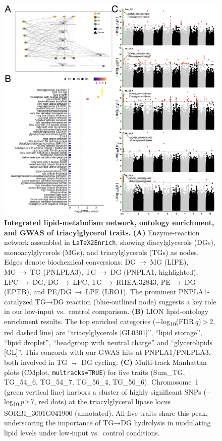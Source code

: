 \documentclass[10pt,letterpaper]{article}
\begin{document}
\begin{figure}[ht]
  \centering
  \includegraphics[width=\textwidth]{fig/main/Fig6.png}
  \caption{\textbf{Integrated lipid‐metabolism network, ontology enrichment, and GWAS of triacylglycerol traits.}
    \textbf{(A)} Enzyme‐reaction network assembled in \texttt{LaTeX2Enrich}, showing diacylglycerols (DGs), monoacylglycerols (MGs), and triacylglycerols (TGs) as nodes.  Edges denote biochemical conversions: DG → MG (LIPE), MG → TG (PNLPLA3), TG → DG (PNPLA1, highlighted), LPC → DG, DG → LPC, TG → RHEA:32843, PE → DG (EPTB), and PE/DG → LPE (LRO1).  The prominent PNPLA1‐catalyzed TG→DG reaction (blue‐outlined node) suggests a key role in our low‑input vs.\ control comparison.
    \textbf{(B)} LION lipid‐ontology enrichment results.  The top enriched categories (−log\textsubscript{10}(FDR $q$) > 2, red dashed line) are “triacylglycerols [GL0301]”, “lipid storage”, “lipid droplet”, “headgroup with neutral charge” and “glycerolipids [GL]”.  This concords with our GWAS hits at PNPLA1/PNLPLA3, both involved in TG ↔ DG cycling.
    \textbf{(C)} Multi‑track Manhattan plots (CMplot, \texttt{multracks=TRUE}) for five traits (Sum\_TG, TG\_54\_6, TG\_54\_7, TG\_56\_4, TG\_56\_6).  Chromosome 1 (green vertical line) harbors a cluster of highly significant SNPs (–log\textsubscript{10} $p$ ≥ 7, red dots) at the triacylglycerol lipase locus SORBI\_3001G041900 (annotated).  All five traits share this peak, underscoring the importance of TG→DG hydrolysis in modulating lipid levels under low‑input vs.\ control conditions.}
  \label{fig:Fig6}
\end{figure}
\end{document}
